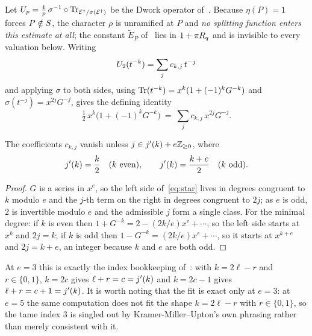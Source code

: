 Let $U_p = \frac{1}{p}\,\sigma^{-1} \circ \operatorname{Tr}_{\mathcal{E}^{\dagger}/\sigma(\mathcal{E}^{\dagger})}$ be the
Dwork operator of~\cite[Definition 4.9]{kramermillerupton2021newton}. Because
$\eta(P) = 1$ forces $P \notin S$, the character $\rho$ is unramified at
$P$ and \emph{no splitting function enters this estimate at all}; the
constant $\widetilde{E}_P$ of~\cite[Proposition 6.4]{kramermillerupton2021newton} lies in $1 + \pi R_q$ and is
invisible to every valuation below. Writing
\begin{equation}
\label{eq:defn-c}
  U_2(t^{-k}) = \sum_j c_{k,j}\, t^{-j}
\end{equation}
and applying $\sigma$ to both sides, using $\operatorname{Tr}(t^{-k}) = x^k(1 +
(-1)^k G^{-k})$ and $\sigma(t^{-j}) = x^{2j}G^{-j}$, gives the defining
identity
\begin{equation}
\label{eq:star}
  \tfrac{1}{2}\, x^k \bigl( 1 + (-1)^k G^{-k} \bigr)
  \ = \ \sum_j c_{k,j}\, x^{2j} G^{-j} .
\end{equation}

\begin{lemma}[Support]
\label{lem:support}
The coefficients $c_{k,j}$ vanish unless $j \in j'(k) + e\mathbb{Z}_{\ge 0}$, where
\[
  j'(k) = \frac{k}{2} \quad (k \text{ even}), \qquad
  j'(k) = \frac{k+e}{2} \quad (k \text{ odd}).
\]
\end{lemma}

\begin{proof}
$G$ is a series in $x^e$, so the left side of~\eqref{eq:star} lives in
degrees congruent to $k$ modulo $e$ and the $j$-th term on the right in
degrees congruent to $2j$; as $e$ is odd, $2$ is invertible modulo $e$ and
the admissible $j$ form a single class. For the minimal degree: if $k$ is
even then $1 + G^{-k} = 2 - (2k/e)x^e + \cdots$, so the left side starts at
$x^k$ and $2j = k$; if $k$ is odd then $1 - G^{-k} = (2k/e)x^e + \cdots$, so
it starts at $x^{k+e}$ and $2j = k+e$, an integer because $k$ and $e$ are
both odd.
\end{proof}

At $e = 3$ this is exactly the index bookkeeping of~\cite[Remark 6.5]{kramermillerupton2021newton}: with $k = 2\ell - r$ and $r \in
\{0,1\}$, $k = 2c$ gives $\ell + r = c = j'(k)$ and $k = 2c-1$ gives
$\ell + r = c+1 = j'(k)$. It is worth noting that the fit is exact only at
$e = 3$: at $e = 5$ the same computation does not fit the shape $k = 2\ell -
r$ with $r \in \{0,1\}$, so the tame index $3$ is singled out by
Kramer-Miller--Upton's own phrasing rather than merely consistent with it.

